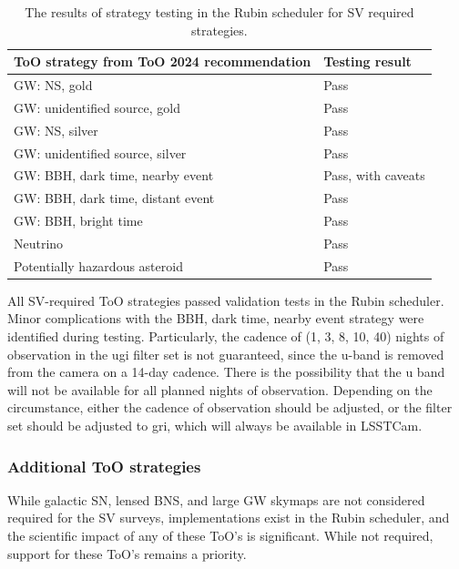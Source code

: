\begin{table}[]
\centering
\begin{tabular}{|l|l|}
\hline
ToO strategy from ToO 2024 recommendation & Testing result       \\ \hline
GW: NS, gold                              & Pass                 \\ \hline
GW: unidentified source, gold             & Pass                 \\ \hline
GW: NS, silver                            & Pass                 \\ \hline
GW: unidentified source, silver           & Pass                 \\ \hline
GW: BBH, dark time, nearby event                             & Pass, with caveats \\ \hline
GW: BBH, dark time, distant event                              & Pass \\ \hline
GW: BBH, bright time                                & Pass \\ \hline
Neutrino                                  & Pass                 \\ \hline
Potentially hazardous asteroid                      & Pass                 \\ \hline
\end{tabular}
\caption{The results of strategy testing in the Rubin scheduler for SV required strategies.}
\label{tab:SVRequiredStrategy results}
\end{table}

All SV-required ToO strategies passed validation tests in the Rubin scheduler. Minor complications with the BBH, dark time, nearby event strategy were identified during testing. Particularly, the cadence of (1, 3, 8, 10, 40) nights of observation in the ugi filter set is not guaranteed, since the u-band is removed from the camera on a 14-day cadence. There is the possibility that the u band will not be available for all planned nights of observation. Depending on the circumstance, either the cadence of observation should be adjusted, or the filter set should be adjusted to gri, which will always be available in LSSTCam.

\subsubsection{Additional ToO strategies}\label{subsubsec:SVOptionalValidation}

While galactic SN, lensed BNS, and large GW skymaps are not considered required for the SV surveys, implementations exist in the Rubin scheduler, and the scientific impact of any of these ToO's is significant. While not required, support for these ToO's remains a priority.

